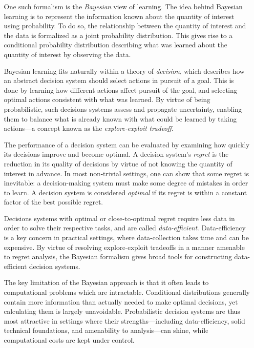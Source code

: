 \documentclass[11pt]{book}
\begin{document}
One such formalism is the \emph{Bayesian} view of learning.
The idea behind Bayesian learning is to represent the information known about the quantity of interest using probability.
To do so, the relationship between the quantity of interest and the data is formalized as a joint probability distribution.
This gives rise to a conditional probability distribution describing what was learned about the quantity of interest by observing the data.

Bayesian learning fits naturally within a theory of \emph{decision}, which describes how an abstract decision system should select actions in pursuit of a goal.
This is done by learning how different actions affect pursuit of the goal, and selecting optimal actions consistent with what was learned.
By virtue of being probabilistic, such decisions systems assess and propagate uncertainty, enabling them to balance what is already known with what could be learned by taking actions---a concept known as the \emph{explore-exploit tradeoff}.

The performance of a decision system can be evaluated by examining how quickly its decisions improve and become optimal.
A decision system's \emph{regret} is the reduction in its quality of decisions by virtue of not knowing the quantity of interest in advance.
In most non-trivial settings, one can show that some regret is inevitable: a decision-making system must make some degree of mistakes in order to learn.
A decision system is considered \emph{optimal} if its regret is within a constant factor of the best possible regret.

Decisions systems with optimal or close-to-optimal regret require less data in order to solve their respective tasks, and are called \emph{data-efficient}.
Data-efficiency is a key concern in practical settings, where data-collection takes time and can be expensive.
By virtue of resolving explore-exploit tradeoffs in a manner amenable to regret analysis, the Bayesian formalism gives broad tools for constructing data-efficient decision systems.

The key limitation of the Bayesian approach is that it often leads to computational problems which are intractable.
Conditional distributions generally contain more information than actually needed to make optimal decisions, yet calculating them is largely unavoidable.
Probabilistic decision systems are thus most attractive in settings where their strengths---including data-efficiency, solid technical foundations, and amenability to analysis---can shine, while computational costs are kept under control.
\end{document}
